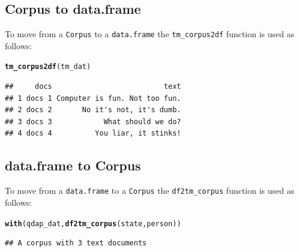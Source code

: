 \documentclass{article}\usepackage[]{graphicx}\usepackage[]{color}
\makeatletter
\newcommand{\hlstd}[1]{\textcolor[rgb]{0.345,0.345,0.345}{#1}}%
\newcommand{\hlkwd}[1]{\textcolor[rgb]{0.737,0.353,0.396}{\textbf{#1}}}%
\newenvironment{kframe}{%
 \def\at@end@of@kframe{}%
 \ifinner\ifhmode%
  \def\at@end@of@kframe{\end{minipage}}%
  \begin{minipage}{\columnwidth}%
 \fi\fi%
 \def\FrameCommand##1{\hskip\@totalleftmargin \hskip-\fboxsep
 \colorbox{shadecolor}{##1}\hskip-\fboxsep
     \hskip-\linewidth \hskip-\@totalleftmargin \hskip\columnwidth}%
 \MakeFramed {\advance\hsize-\width
   \@totalleftmargin\z@ \linewidth\hsize
   \@setminipage}}%
 {\par\unskip\endMakeFramed%
 \at@end@of@kframe}
\newenvironment{knitrout}{}{} %
\makeatother
\begin{document}

\subsection{Corpus to data.frame}

\hspace{.4cm} To move from a \texttt{Corpus} to a \texttt{data.frame} the \texttt{tm\_corpus2df} function is used as follows:

\begin{knitrout}
\color{fgcolor}\begin{kframe}
\begin{alltt}
\hlkwd{tm_corpus2df}\hlstd{(tm_dat)}
\end{alltt}
\end{kframe}
\end{knitrout}


\begin{knitrout}
\color{fgcolor}\begin{kframe}
\begin{verbatim}
##     docs                          text
## 1 docs 1 Computer is fun. Not too fun.
## 2 docs 2       No it's not, it's dumb.
## 3 docs 3            What should we do?
## 4 docs 4          You liar, it stinks!
\end{verbatim}
\end{kframe}
\end{knitrout}


\subsection{data.frame to Corpus}

\hspace{.4cm} To move from a \texttt{data.frame} to a \texttt{Corpus} the \texttt{df2tm\_corpus} function is used as follows:

\begin{knitrout}
\color{fgcolor}\begin{kframe}
\begin{alltt}
\hlkwd{with}\hlstd{(qdap_dat,} \hlkwd{df2tm_corpus}\hlstd{(state, person))}
\end{alltt}
\end{kframe}
\end{knitrout}


\begin{knitrout}
\color{fgcolor}\begin{kframe}
\begin{verbatim}
## A corpus with 3 text documents
\end{verbatim}
\end{kframe}
\end{knitrout}
\end{document}
